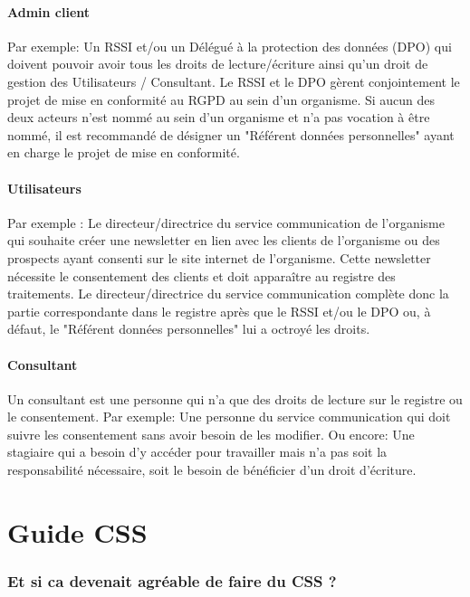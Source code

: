 \documentclass[12pt, a4paper]{report}
\begin{document}
\subsubsection{Admin client}
Par exemple: Un RSSI et/ou un Délégué à la protection des données (DPO) qui doivent pouvoir avoir tous les droits de lecture/écriture ainsi qu'un droit de gestion des Utilisateurs / Consultant.\newline
Le RSSI et le DPO gèrent conjointement le projet de mise en conformité au RGPD au sein d'un organisme.\newline
Si aucun des deux acteurs n'est nommé au sein d'un organisme et n'a pas vocation à être nommé, il est recommandé de désigner un "Référent données personnelles" ayant en charge le projet de mise en conformité.
\newpage
\subsubsection{Utilisateurs}
Par exemple : Le directeur/directrice du service communication de l'organisme qui souhaite créer une newsletter en lien avec les clients de l'organisme ou des prospects ayant consenti sur le site internet de l'organisme.\newline
Cette newsletter nécessite le consentement des clients et doit apparaître au registre des traitements.\newline
Le directeur/directrice du service communication complète donc la partie correspondante dans le registre après que le RSSI et/ou le DPO ou, à défaut, le "Référent données personnelles" lui a octroyé les droits.
\subsubsection{Consultant}
Un consultant est une personne qui n'a que des droits de lecture sur le registre ou le consentement.\newline
Par exemple: Une personne du service communication qui doit suivre les consentement sans avoir besoin de les modifier.\newline
Ou encore: Une stagiaire qui a besoin d'y accéder pour travailler mais n'a pas soit la responsabilité nécessaire, soit le besoin de bénéficier d'un droit d'écriture.\newline
\chapter{Guide CSS}
\subsection{Et si ca devenait agréable de faire du CSS ?}
\end{document}
